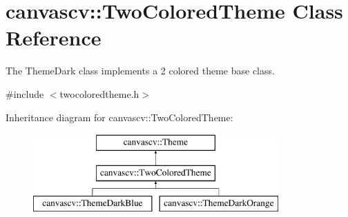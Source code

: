 \hypertarget{classcanvascv_1_1TwoColoredTheme}{}\section{canvascv\+:\+:Two\+Colored\+Theme Class Reference}
\label{classcanvascv_1_1TwoColoredTheme}


The Theme\+Dark class implements a 2 colored theme base class.  




{\ttfamily \#include $<$twocoloredtheme.\+h$>$}

Inheritance diagram for canvascv\+:\+:Two\+Colored\+Theme\+:\begin{figure}[H]
\begin{center}
\leavevmode
\includegraphics[height=3.000000cm]{classcanvascv_1_1TwoColoredTheme}
\end{center}
\end{figure}
